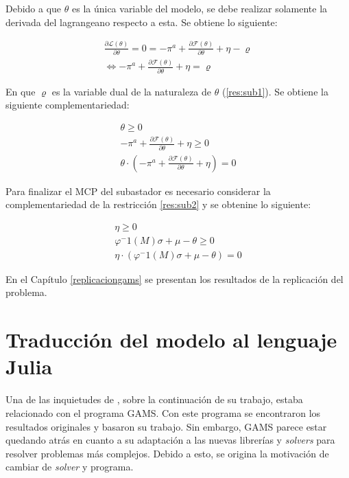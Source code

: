 Debido a que $\theta$ es la única variable del modelo, se debe realizar solamente la derivada del lagrangeano respecto a esta. Se obtiene lo siguiente:

\begin{footnotesize}
\begin{align}
    \frac{\partial \mathcal{L}(\theta) }{\partial \theta} = 0 =  -\pi^a + \frac{\partial\mathcal{F}(\theta)}{\partial \theta} + \eta - \varrho \\
    \Leftrightarrow -\pi^a + \frac{\partial\mathcal{F}(\theta)}{\partial \theta} + \eta = \varrho \label{kkt:subastadororiginal}
\end{align}

\end{footnotesize}

En que $\varrho$ es la variable dual de la naturaleza de $\theta$ (\ref{res:sub1}). Se obtiene la siguiente complementariedad:

\begin{footnotesize}
\begin{align}
    \theta \geq 0 \\
    -\pi^a + \frac{\partial\mathcal{F}(\theta)}{\partial \theta} + \eta \geq 0\\
    \theta \cdot (-\pi^a + \frac{\partial\mathcal{F}(\theta)}{\partial \theta} + \eta)=0
\end{align}

\end{footnotesize}

Para finalizar el MCP del subastador es necesario considerar la complementariedad de la restricción \ref{res:sub2} y se obtenine lo siguiente: 

\begin{footnotesize}
\begin{align}
 \eta \geq 0 \\
 \varphi^-1(M)\sigma+\mu-\theta \geq 0 \\
 \eta \cdot (\varphi^-1(M)\sigma+\mu-\theta)=0
\end{align}
\end{footnotesize}


En el Capítulo \ref{replicaciongams} se presentan los resultados de la replicación del problema.

\section{Traducción del modelo al lenguaje Julia}

Una de las inquietudes de , sobre la continuación de su trabajo, estaba relacionado con el programa GAMS. Con este programa se encontraron los resultados originales y basaron su trabajo. Sin embargo, GAMS parece estar quedando atrás en cuanto a su adaptación a las nuevas librerías y \textit{solvers} para resolver problemas más complejos. Debido a esto, se origina la motivación de cambiar de \textit{solver} y programa.
\vspace{2.5mm}

